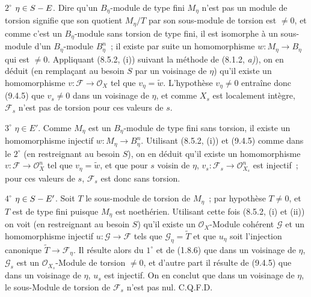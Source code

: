 $2^\circ$ $\eta\in S- E$. Dire qu'un $B_\eta$-module de type fini $M_\eta$
n'est pas un module de torsion signifie que son quotient $M_\eta/T$ par son
sous-module de torsion est $\neq0$, et comme c'est un $B_\eta$-module sans
torsion de type fini, il est isomorphe à un sous-module d'un $B_\eta$-module
$B_\eta^n$~; il existe par suite un homomorphisme
$w:M_\eta\to B_\eta$ qui est $\neq0$. Appliquant (8.5.2, (i)) suivant la
méthode de (8.1.2, \emph{a)}), on en déduit (en remplaçant au besoin $S$ par un
voisinage de $\eta$) qu'il existe un homomorphisme
$v:\mathcal F\to\mathcal O_X$ tel que $v_\eta=\widetilde w$. L'hypothèse
$v_\eta\neq0$ entraîne donc (9.4.5) que $v_s\neq0$ dans un voisinage de
$\eta$, et comme $X_s$ est localement intègre, $\mathcal F_s$ n'est pas de
torsion pour ces valeurs de $s$.

$3^\circ$ $\eta\in E'$. Comme $M_\eta$ est un $B_\eta$-module de type fini
sans torsion, il existe un homomorphisme injectif
$w:M_\eta\to B_\eta^n$. Utilisant (8.5.2, (i)) et (9.4.5) comme dans le
$2^\circ$ (en restreignant au besoin $S$), on en déduit qu'il existe un
homomorphisme $v:\mathcal F\to\mathcal O_X^n$ tel que $v_\eta=\widetilde w$,
et que pour $s$ voisin de $\eta$,
$v_s:\mathcal F_s\to\mathcal O_{X_s}^n$ est injectif~; pour ces valeurs de
$s$, $\mathcal F_s$ est donc sans torsion.

$4^\circ$ $\eta\in S- E'$. Soit $T$ le sous-module de torsion de $M_\eta$~;
par hypothèse $T\neq0$, et $T$ est de type fini puisque $M_\eta$ est
noethérien. Utilisant cette fois (8.5.2, (i) et (ii)) on voit (en restreignant
au besoin $S$) qu'il existe un $\mathcal O_X$-Module cohérent $\mathcal G$ et
un homomorphisme injectif $u:\mathcal G\to\mathcal F$ tels que
$\mathcal G_\eta=\widetilde T$ et que $u_\eta$ soit l'injection canonique
$\widetilde T\to\mathcal F_\eta$. Il résulte alors du $1^\circ$ et de (1.8.6)
que dans un voisinage de $\eta$, $\mathcal G_s$ est un
$\mathcal O_{X_s}$-Module de torsion $\neq0$, et d'autre part il résulte de
(9.4.5) que dans un voisinage de $\eta$, $u_s$ est injectif. On en conclut que
dans un voisinage de $\eta$, le sous-Module de torsion de $\mathcal F_s$ n'est
pas nul. C.Q.F.D.

